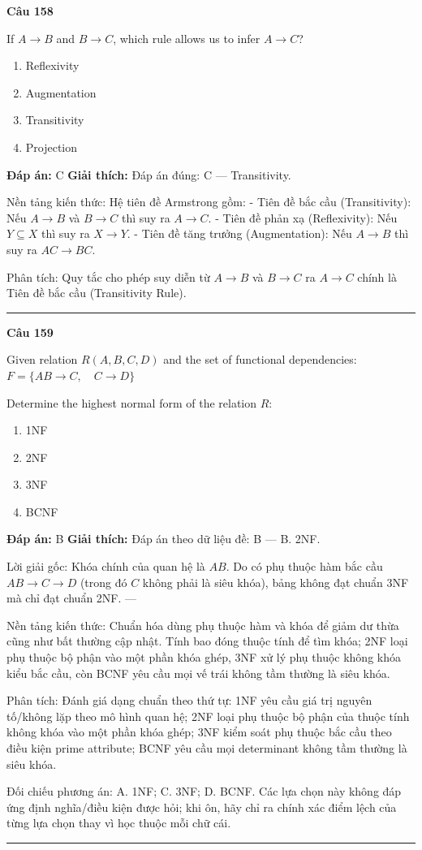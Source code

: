 \documentclass[11pt,a4paper]{article}
\newenvironment{question}[1]{%
  \par\vspace{1em}\noindent\textbf{\large Câu #1}\par\vspace{0.4em}
}{%
  \par\vspace{1em}\hrule\vspace{0.6em}
}
\newenvironment{choices}{%
  \begin{enumerate}[label=\textbf{\Alph*.},leftmargin=2.2em,itemsep=2pt,topsep=3pt]
}{%
  \end{enumerate}
}
\newcommand{\choice}{\item}
\begin{document}
\begin{question}{158}
If $A \to B$ and $B \to C$, which rule allows us to infer $A \to C$?
\begin{choices}
\choice Reflexivity
\choice Augmentation
\choice Transitivity
\choice Projection
\end{choices}
\textbf{Đáp án:} C
\textbf{Giải thích:} Đáp án đúng: C — Transitivity.

Nền tảng kiến thức: Hệ tiên đề Armstrong gồm:
- Tiên đề bắc cầu (Transitivity): Nếu $A \to B$ và $B \to C$ thì suy ra $A \to C$.
- Tiên đề phản xạ (Reflexivity): Nếu $Y \subseteq X$ thì suy ra $X \to Y$.
- Tiên đề tăng trưởng (Augmentation): Nếu $A \to B$ thì suy ra $AC \to BC$.

Phân tích: Quy tắc cho phép suy diễn từ $A \to B$ và $B \to C$ ra $A \to C$ chính là Tiên đề bắc cầu (Transitivity Rule).
\end{question}

\begin{question}{159}
Given relation \(R(A, B, C, D)\) and the set of functional dependencies:
\(F = \{ AB \rightarrow C, \quad C \rightarrow D \}\)

Determine the highest normal form of the relation \(R\):
\begin{choices}
\choice 1NF
\choice 2NF
\choice 3NF
\choice BCNF
\end{choices}
\textbf{Đáp án:} B
\textbf{Giải thích:} Đáp án theo dữ liệu đề: B — B. 2NF.

Lời giải gốc: Khóa chính của quan hệ là $AB$. Do có phụ thuộc hàm bắc cầu $AB \to C \to D$ (trong đó $C$ không phải là siêu khóa), bảng không đạt chuẩn 3NF mà chỉ đạt chuẩn 2NF. ---

Nền tảng kiến thức: Chuẩn hóa dùng phụ thuộc hàm và khóa để giảm dư thừa cũng như bất thường cập nhật. Tính bao đóng thuộc tính để tìm khóa; 2NF loại phụ thuộc bộ phận vào một phần khóa ghép, 3NF xử lý phụ thuộc không khóa kiểu bắc cầu, còn BCNF yêu cầu mọi vế trái không tầm thường là siêu khóa.

Phân tích: Đánh giá dạng chuẩn theo thứ tự: 1NF yêu cầu giá trị nguyên tố/không lặp theo mô hình quan hệ; 2NF loại phụ thuộc bộ phận của thuộc tính không khóa vào một phần khóa ghép; 3NF kiểm soát phụ thuộc bắc cầu theo điều kiện prime attribute; BCNF yêu cầu mọi determinant không tầm thường là siêu khóa.

Đối chiếu phương án: A. 1NF; C. 3NF; D. BCNF. Các lựa chọn này không đáp ứng định nghĩa/điều kiện được hỏi; khi ôn, hãy chỉ ra chính xác điểm lệch của từng lựa chọn thay vì học thuộc mỗi chữ cái.
\end{question}
\end{document}
